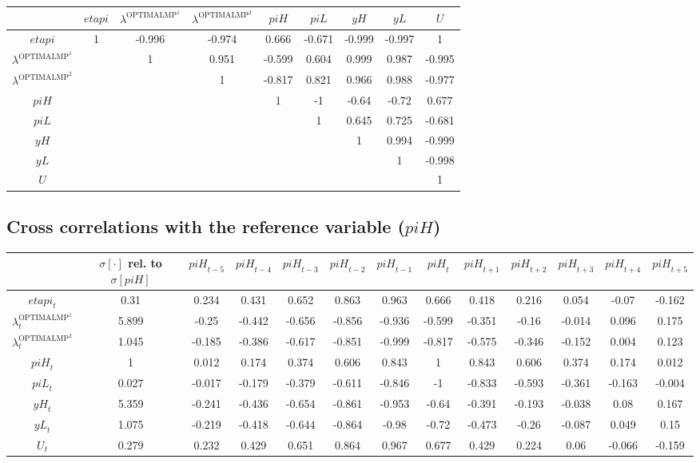 \begin{tabular}{c|cccccccc|}
  & ${e\!t\!a\!p\!i}$ & $\lambda^{\mathrm{OPTIMALMP}^{\mathrm{1}}}$ & $\lambda^{\mathrm{OPTIMALMP}^{\mathrm{2}}}$ & ${p\!i\!H}$ & ${p\!i\!L}$ & ${y\!H}$ & ${y\!L}$ & $U$\\
\hline
${e\!t\!a\!p\!i}$ & 1 & -0.996 & -0.974 & 0.666 & -0.671 & -0.999 & -0.997 & 1 \\
$\lambda^{\mathrm{OPTIMALMP}^{\mathrm{1}}}$ &  & 1 & 0.951 & -0.599 & 0.604 & 0.999 & 0.987 & -0.995 \\
$\lambda^{\mathrm{OPTIMALMP}^{\mathrm{2}}}$ &  &  & 1 & -0.817 & 0.821 & 0.966 & 0.988 & -0.977 \\
${p\!i\!H}$ &  &  &  & 1 & -1 & -0.64 & -0.72 & 0.677 \\
${p\!i\!L}$ &  &  &  &  & 1 & 0.645 & 0.725 & -0.681 \\
${y\!H}$ &  &  &  &  &  & 1 & 0.994 & -0.999 \\
${y\!L}$ &  &  &  &  &  &  & 1 & -0.998 \\
$U$ &  &  &  &  &  &  &  & 1 \\
\hline
\end{tabular}


\subsection{Cross correlations with the reference variable (${p\!i\!H}$)}

\begin{tabular}{c|c|c|c|c|c|c|c|c|c|c|c|c|}
  & $\sigma[\cdot]$ rel. to $\sigma[{p\!i\!H}]$ & ${p\!i\!H}_{t-5}$ & ${p\!i\!H}_{t-4}$ & ${p\!i\!H}_{t-3}$ & ${p\!i\!H}_{t-2}$ & ${p\!i\!H}_{t-1}$ & ${p\!i\!H}_{t}$ & ${p\!i\!H}_{t+1}$ & ${p\!i\!H}_{t+2}$ & ${p\!i\!H}_{t+3}$ & ${p\!i\!H}_{t+4}$ & ${p\!i\!H}_{t+5}$\\
\hline
${e\!t\!a\!p\!i}_{t}$ & 0.31 & 0.234 & 0.431 & 0.652 & 0.863 & 0.963 & 0.666 & 0.418 & 0.216 & 0.054 & -0.07 & -0.162 \\
$\lambda^{\mathrm{OPTIMALMP}^{\mathrm{1}}}_{t}$ & 5.899 & -0.25 & -0.442 & -0.656 & -0.856 & -0.936 & -0.599 & -0.351 & -0.16 & -0.014 & 0.096 & 0.175 \\
$\lambda^{\mathrm{OPTIMALMP}^{\mathrm{2}}}_{t}$ & 1.045 & -0.185 & -0.386 & -0.617 & -0.851 & -0.999 & -0.817 & -0.575 & -0.346 & -0.152 & 0.004 & 0.123 \\
${p\!i\!H}_{t}$ & 1 & 0.012 & 0.174 & 0.374 & 0.606 & 0.843 & 1 & 0.843 & 0.606 & 0.374 & 0.174 & 0.012 \\
${p\!i\!L}_{t}$ & 0.027 & -0.017 & -0.179 & -0.379 & -0.611 & -0.846 & -1 & -0.833 & -0.593 & -0.361 & -0.163 & -0.004 \\
${y\!H}_{t}$ & 5.359 & -0.241 & -0.436 & -0.654 & -0.861 & -0.953 & -0.64 & -0.391 & -0.193 & -0.038 & 0.08 & 0.167 \\
${y\!L}_{t}$ & 1.075 & -0.219 & -0.418 & -0.644 & -0.864 & -0.98 & -0.72 & -0.473 & -0.26 & -0.087 & 0.049 & 0.15 \\
$U_{t}$ & 0.279 & 0.232 & 0.429 & 0.651 & 0.864 & 0.967 & 0.677 & 0.429 & 0.224 & 0.06 & -0.066 & -0.159 \\
\hline
\end{tabular}



